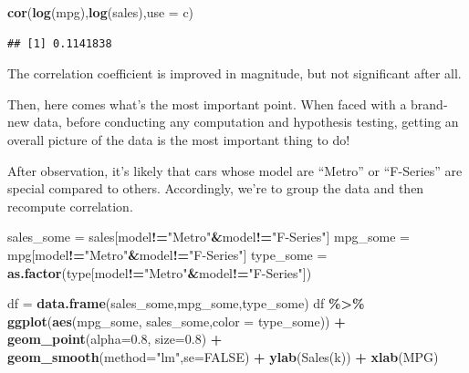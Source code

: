 \documentclass[
]{ctexart}
\newenvironment{Shaded}{\begin{snugshade}}{\end{snugshade}}
\newcommand{\AttributeTok}[1]{\textcolor[rgb]{0.13,0.29,0.53}{#1}}
\newcommand{\ConstantTok}[1]{\textcolor[rgb]{0.56,0.35,0.01}{#1}}
\newcommand{\FloatTok}[1]{\textcolor[rgb]{0.00,0.00,0.81}{#1}}
\newcommand{\FunctionTok}[1]{\textcolor[rgb]{0.13,0.29,0.53}{\textbf{#1}}}
\newcommand{\NormalTok}[1]{#1}
\newcommand{\OtherTok}[1]{\textcolor[rgb]{0.56,0.35,0.01}{#1}}
\newcommand{\SpecialCharTok}[1]{\textcolor[rgb]{0.81,0.36,0.00}{\textbf{#1}}}
\newcommand{\StringTok}[1]{\textcolor[rgb]{0.31,0.60,0.02}{#1}}
\begin{document}
\begin{Shaded}
\begin{Highlighting}[]
\FunctionTok{cor}\NormalTok{(}\FunctionTok{log}\NormalTok{(mpg),}\FunctionTok{log}\NormalTok{(sales),}\AttributeTok{use =} \StringTok{\textquotesingle{}c\textquotesingle{}}\NormalTok{)}
\end{Highlighting}
\end{Shaded}

\begin{verbatim}
## [1] 0.1141838
\end{verbatim}

The correlation coefficient is improved in magnitude, but not
significant after all.

Then, here comes what's the most important point. When faced with a
brand-new data, before conducting any computation and hypothesis
testing, getting an overall picture of the data is the most important
thing to do!

After observation, it's likely that cars whose model are ``Metro'' or
``F-Series'' are special compared to others. Accordingly, we're to group
the data and then recompute correlation.

\begin{Shaded}
\begin{Highlighting}[]
\NormalTok{sales\_some }\OtherTok{=}\NormalTok{ sales[model}\SpecialCharTok{!=}\StringTok{"Metro"}\SpecialCharTok{\&}\NormalTok{model}\SpecialCharTok{!=}\StringTok{"F{-}Series"}\NormalTok{]}
\NormalTok{mpg\_some }\OtherTok{=}\NormalTok{ mpg[model}\SpecialCharTok{!=}\StringTok{"Metro"}\SpecialCharTok{\&}\NormalTok{model}\SpecialCharTok{!=}\StringTok{"F{-}Series"}\NormalTok{]}
\NormalTok{type\_some }\OtherTok{=} \FunctionTok{as.factor}\NormalTok{(type[model}\SpecialCharTok{!=}\StringTok{"Metro"}\SpecialCharTok{\&}\NormalTok{model}\SpecialCharTok{!=}\StringTok{"F{-}Series"}\NormalTok{])}

\NormalTok{df }\OtherTok{=} \FunctionTok{data.frame}\NormalTok{(sales\_some,mpg\_some,type\_some)}
\NormalTok{df }\SpecialCharTok{\%\textgreater{}\%}
  \FunctionTok{ggplot}\NormalTok{(}\FunctionTok{aes}\NormalTok{(mpg\_some, sales\_some,}\AttributeTok{color =}\NormalTok{ type\_some)) }\SpecialCharTok{+}
  \FunctionTok{geom\_point}\NormalTok{(}\AttributeTok{alpha=}\FloatTok{0.8}\NormalTok{, }\AttributeTok{size=}\FloatTok{0.8}\NormalTok{) }\SpecialCharTok{+}
  \FunctionTok{geom\_smooth}\NormalTok{(}\AttributeTok{method=}\StringTok{"lm"}\NormalTok{,}\AttributeTok{se=}\ConstantTok{FALSE}\NormalTok{) }\SpecialCharTok{+}
  \FunctionTok{ylab}\NormalTok{(}\StringTok{\textquotesingle{}Sales(k)\textquotesingle{}}\NormalTok{) }\SpecialCharTok{+}
  \FunctionTok{xlab}\NormalTok{(}\StringTok{\textquotesingle{}MPG\textquotesingle{}}\NormalTok{)}
\end{Highlighting}
\end{Shaded}
\end{document}
